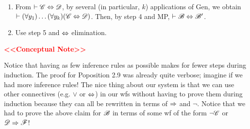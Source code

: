 \begin{enumerate}
\begin{enumerate} [label = Case \arabic*., leftmargin=2\parindent]
        \[(A \imp (\B \bicon C)) \land (A \imp (D \bicon E)) \imp (A \imp [( B \imp D) \bicon (C \imp E)])\]
        This might seem like a scarily long and arbitrary wf. However, if you follow along closely, you can see that it actually works out very nicely. We follow a similar procedure to case 2. Let $[(\forall y_1) \dots (\forall y_k)(\C \bicon \D)]$ be A, $\Escr$ be $B$, and so on. Notice that the premise of our tautology matches both applications of \textbf{IH} joined by $\land$. So, by MP we obtain the antecedent of our tautology. Substitute back in our wfs and we obtain:
        \[\vdash [(\forall y_1) \dots (\forall y_k)(\C \bicon \D)] \imp (\lnot \Escr \bicon \lnot \Escr ')\]
        \item $\B$ is $(\forall x) \Escr$. Let $\B'$ be $(\forall x) \Escr '$. By \textbf{IH}:
        \[\vdash [(\forall y_1) \dots (\forall y_k)(\C \bicon \D)] \imp (\Escr \bicon \Escr ')\]
        Now, $x$ does not occur free in $(\forall y_1) \dots (\forall y_k)(\C \bicon \D)$ because, if it did, it would be free in $\C$ or $\D$ and, since it is bound in $\B$, it would be one of $y_1,\dots, y_k$. and it would not be free in $(\forall y_1) \dots (\forall y_k)(\C \bicon \D)$. Hence, by axiom (A5) we obtain:
        \[\vdash (\forall y_1) \dots (\forall y_k)(\C \bicon \D) \imp (\forall x)(\Escr \bicon \Escr ')\]
        By Lemma 2.8, we also obtain: \textcolor{red}{\textbf{<<Typo on this statement on pg 77!>>}}
        \[\vdash (\forall x)(\Escr \bicon \Escr ') \imp ((\forall x)\Escr \bicon (\forall x) \Escr ')\] 
        Then, by a suitable tautology and MP:
        \[\vdash [(\forall y_1) \dots (\forall y_k)(\C \bicon \D)] \imp (\B \bicon \B')\]
    \end{enumerate}
    \item From $\vdash \mathscr{C} \Leftrightarrow \mathscr{D}$, by several (in particular, $k$) applications of Gen, we obtain $\vdash (\forall y_1) \dots (\forall y_k)(\mathscr{C} \Leftrightarrow \mathscr{D})$. Then, by step 4 and MP, $\vdash \mathscr{B} \Leftrightarrow \mathscr{B}'$.
    \item Use step 5 and $\Leftrightarrow$ elimination.
\end{enumerate}

\textcolor{red}{\textbf{<<Conceptual Note>>}}

Notice that having as few inference rules as possible makes for fewer steps during induction. The proof for Poposition 2.9 was already quite verbose; imagine if we had more inference rules! The nice thing about our system is that we can use other connectives (e.g. $\lor$ or $\Leftrightarrow$) in our wfs without having to prove them during induction because they can all be rewritten in terms of $\Rightarrow$ and $\lnot$. Notice that we had to prove the above claim for $\B$ in terms of some wf of the form $\lnot \mathscr{C}$ or $\mathscr{D} \Rightarrow \mathscr{F}$!
